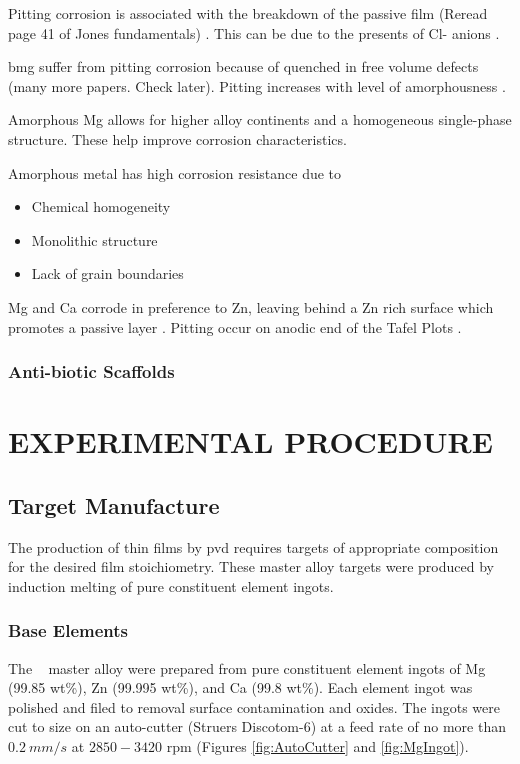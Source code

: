 \documentclass[a4paper,12pt,oneside]{report}%
\begin{document}
Pitting corrosion is associated with the breakdown of the passive film (Reread page 41 of Jones fundamentals) \cite{Zheng2014, Jones1992, Schweitzer2009}. This can be due to the presents of Cl- anions \cite{Zheng2014}. 

 \Gls{bmg} suffer from pitting corrosion because of quenched in free volume defects \cite{Wang2012} (many more papers. Check later). Pitting increases with level of amorphousness \cite{Schluter2012}. 

Amorphous Mg allows for higher alloy continents and a homogeneous single-phase structure. These help improve corrosion characteristics. 

Amorphous metal has high corrosion resistance due to

\begin{itemize}
	\item Chemical homogeneity 
	\item Monolithic structure
	\item Lack of grain boundaries 
\end{itemize}
 
Mg and Ca corrode in preference to Zn, leaving behind a Zn rich surface which promotes a passive layer \cite{Wang2012}.
Pitting occur on anodic end of the Tafel Plots \cite{Schluter2012}.

\subsection{Anti-biotic Scaffolds}



\chapter{EXPERIMENTAL PROCEDURE}
\glsresetall

\section{Target Manufacture} \label{sec:TargetManufacture}
The production of thin films by \gls{pvd} requires targets of appropriate composition for the desired film stoichiometry. These master alloy targets were produced by induction melting of pure constituent element ingots.

\subsection{Base Elements}
The \MgZnCa~ master alloy were prepared from pure constituent element ingots of Mg (99.85 wt\%), Zn (99.995 wt\%), and Ca (99.8 wt\%). Each element ingot was polished and filed to removal surface contamination and oxides. The ingots were cut to size on an auto-cutter (Struers Discotom-6) at a feed rate of no more than $0.2~ mm/s$ at $2850 - 3420$ \acrshort{rpm} (Figures \ref{fig:AutoCutter} and \ref{fig:MgIngot}).
\end{document}
